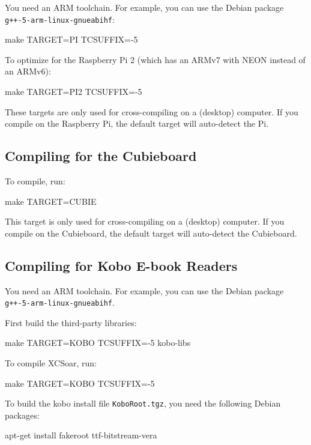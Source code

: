 You need an ARM toolchain.  For example, you can use the Debian
package \verb|g++-5-arm-linux-gnueabihf|:

\begin{verbatim*}
make TARGET=PI TCSUFFIX=-5
\end{verbatim*}

To optimize for the Raspberry Pi 2 (which has an ARMv7 with NEON
instead of an ARMv6):

\begin{verbatim*}
make TARGET=PI2 TCSUFFIX=-5
\end{verbatim*}

These targets are only used for cross-compiling on a (desktop)
computer.
If you compile on the Raspberry Pi, the default target will
auto-detect the Pi.

\subsection{Compiling for the Cubieboard}

To compile, run:

\begin{verbatim*}
make TARGET=CUBIE
\end{verbatim*}

This target is only used for cross-compiling on a (desktop) computer.
If you compile on the Cubieboard, the default target will auto-detect
the Cubieboard.

\subsection{Compiling for Kobo E-book Readers}

You need an ARM toolchain.  For example, you can use the Debian
package \verb|g++-5-arm-linux-gnueabihf|.

First build the third-party libraries:

\begin{verbatim*}
make TARGET=KOBO TCSUFFIX=-5 kobo-libs
\end{verbatim*}

To compile XCSoar, run:

\begin{verbatim*}
make TARGET=KOBO TCSUFFIX=-5
\end{verbatim*}

To build the kobo install file \texttt{KoboRoot.tgz}, you need the
following Debian packages:

\begin{verbatim*}
apt-get install fakeroot ttf-bitstream-vera
\end{verbatim*}

